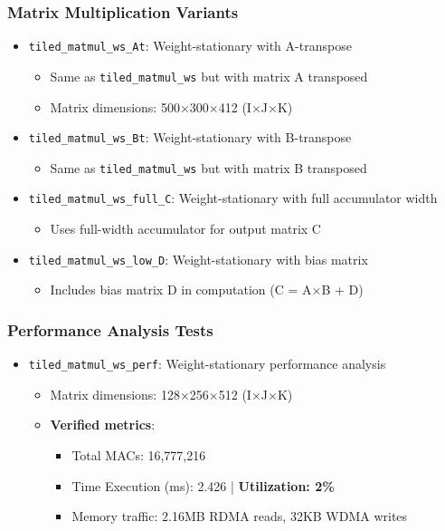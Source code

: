 \subsubsection{Matrix Multiplication Variants}
\begin{itemize}
\item \texttt{tiled\_matmul\_ws\_At}: Weight-stationary with A-transpose
  \begin{itemize}
  \item Same as \texttt{tiled\_matmul\_ws} but with matrix A transposed
  \item Matrix dimensions: 500$\times$300$\times$412 (I$\times$J$\times$K)
  \end{itemize}

\item \texttt{tiled\_matmul\_ws\_Bt}: Weight-stationary with B-transpose
  \begin{itemize}
  \item Same as \texttt{tiled\_matmul\_ws} but with matrix B transposed
  \end{itemize}

\item \texttt{tiled\_matmul\_ws\_full\_C}: Weight-stationary with full accumulator width
  \begin{itemize}
  \item Uses full-width accumulator for output matrix C
  \end{itemize}

\item \texttt{tiled\_matmul\_ws\_low\_D}: Weight-stationary with bias matrix
  \begin{itemize}
  \item Includes bias matrix D in computation (C = A$\times$B + D)
  \end{itemize}
\end{itemize}

\subsubsection{Performance Analysis Tests}
\begin{itemize}
\item \texttt{tiled\_matmul\_ws\_perf}: Weight-stationary performance analysis
  \begin{itemize}
  \item Matrix dimensions: 128$\times$256$\times$512 (I$\times$J$\times$K)
  \item \textbf{Verified metrics}: 
    \begin{itemize}
    \item Total MACs: 16,777,216
    \item Time Execution (ms): 2.426 | \textbf{Utilization: 2\%}
    \item Memory traffic: 2.16MB RDMA reads, 32KB WDMA writes
    \end{itemize}
  \end{itemize}
\end{itemize}

